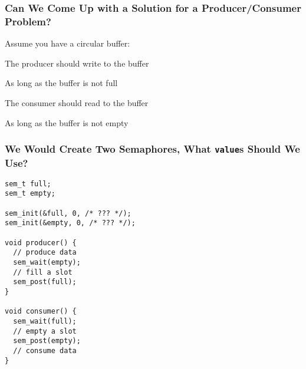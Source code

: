   \begin{frame}
    \frametitle{Can We Come Up with a Solution for a Producer/Consumer Problem?}

    Assume you have a circular buffer:

    \vspace{2em}


    \vspace{2em}

    The producer should write to the buffer

    \hspace{2em} As long as the buffer is not full

    \vspace{2em}

    The consumer should read to the buffer

    \hspace{2em} As long as the buffer is not empty
  \end{frame}

  \begin{frame}[fragile]
    \frametitle{We Would Create Two Semaphores, What \texttt{value}s Should We Use?}

    \begin{lstlisting}
sem_t full;
sem_t empty;

sem_init(&full, 0, /* ??? */);
sem_init(&empty, 0, /* ??? */);

void producer() {
  // produce data
  sem_wait(empty);
  // fill a slot
  sem_post(full);
}

void consumer() {
  sem_wait(full);
  // empty a slot
  sem_post(empty);
  // consume data
}
    \end{lstlisting}
  \end{frame}

